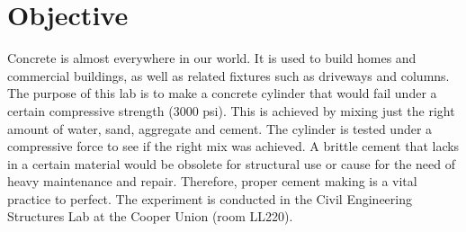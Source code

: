 \documentclass{article}
\begin{document}
    
    \doublespacing
    \tableofcontents
    \newpage
    \listoftables
    \listoffigures
    \newpage
    \section{Objective}
    \indent Concrete is almost everywhere in our world. It is used to build homes and commercial buildings, as well as related fixtures such as driveways and columns. The purpose of this lab is to make a concrete cylinder that would fail under a certain compressive strength (3000 psi). This is achieved by mixing just the right amount of water, sand, aggregate and cement. The cylinder is tested under a compressive force to see if the right mix was achieved. A brittle cement that lacks in a certain material would be obsolete for structural use or cause for the need of heavy maintenance and repair. Therefore, proper cement making is a vital practice to perfect. The experiment is conducted in the Civil Engineering Structures Lab at the Cooper Union (room LL220).  
    \newpage
\end{document}
